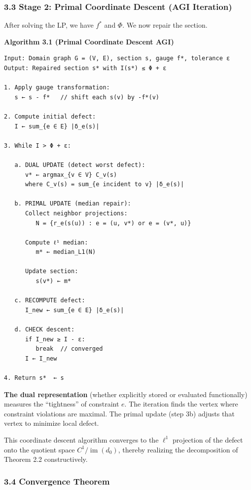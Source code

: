 \documentclass[
]{article}
\begin{document}
\subsubsection{3.3 Stage 2: Primal Coordinate Descent (AGI
Iteration)}\label{stage-2-primal-coordinate-descent-agi-iteration}

After solving the LP, we have \(f^*\) and \(\Phi\). We now repair the
section.

\textbf{Algorithm 3.1 (Primal Coordinate Descent AGI)}

\begin{verbatim}
Input: Domain graph G = (V, E), section s, gauge f*, tolerance ε
Output: Repaired section s* with I(s*) ≤ Φ + ε

1. Apply gauge transformation:
   s ← s - f*   // shift each s(v) by -f*(v)

2. Compute initial defect:
   I ← sum_{e ∈ E} |δ_e(s)|

3. While I > Φ + ε:

   a. DUAL UPDATE (detect worst defect):
      v* ← argmax_{v ∈ V} C_v(s)
      where C_v(s) = sum_{e incident to v} |δ_e(s)|

   b. PRIMAL UPDATE (median repair):
      Collect neighbor projections:
         N = {r_e(s(u)) : e = (u, v*) or e = (v*, u)}

      Compute ℓ¹ median:
         m* ← median_L1(N)

      Update section:
         s(v*) ← m*

   c. RECOMPUTE defect:
      I_new ← sum_{e ∈ E} |δ_e(s)|

   d. CHECK descent:
      if I_new ≥ I - ε:
         break  // converged
      I ← I_new

4. Return s*  ← s
\end{verbatim}

\textbf{The dual representation} (whether explicitly stored or evaluated
functionally) measures the ``tightness'' of constraint \(e\). The
iteration finds the vertex where constraint violations are maximal. The
primal update (step 3b) adjusts that vertex to minimize local defect.

This coordinate descent algorithm converges to the \(\ell^1\) projection
of the defect onto the quotient space \(C^1 / \operatorname{im}(d_0)\),
thereby realizing the decomposition of Theorem 2.2 constructively.

\subsubsection{3.4 Convergence Theorem}\label{convergence-theorem}
\end{document}
